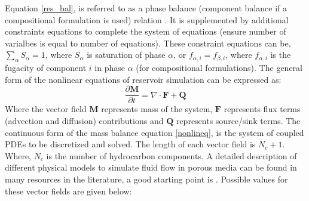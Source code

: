 Equation \ref{res_bal}, is referred to as a phase balance (component balance if a compositional formulation is used) relation . It is supplemented by
additional constraints equations to complete the system of equations (ensure number of varialbes is equal to number of equations). These constraint
equations can be, $\sum_{\alpha}S_{\alpha} = 1$, where  $S_{\alpha}$ is saturation of phase $\alpha$, or $f_{\alpha,i} = f_{\beta,i}$, where $f_{\alpha,i}$
is the fugacity of component $i$ in phase $\alpha$ (for compositional formulations). 
The general form of the nonlinear equations of reservoir simulation can be expressed as\supercite{roy}:
\begin{equation}
	\frac{\partial\mathbf{M}}{\partial t} = \nabla \cdot \mathbf{F} + \mathbf{Q}
	\label{nonlineq}
\end{equation}
Where the vector field $\mathbf{M}$ represents mass of the system, $\mathbf{F}$ represents flux terms (advection and diffusion) contributions and $\mathbf{Q}$ represents source/sink terms.
The continuous form of the mass balance equation \ref{nonlineq}, is the system of coupled PDEs to be discretized and solved. 
The length of each vector field is $N_{c} + 1$. Where, $N_{c}$ is the number of hydrocarbon components.
A detailed description of different physical models to simulate fluid flow in porous media can be found in many resources in the literature, a good starting point is \cite{cao,aziz}.
Possible values for these vector fields are given below:

